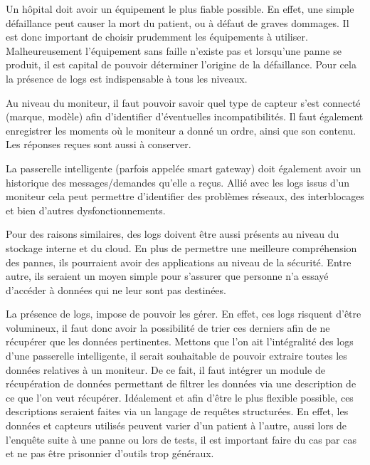 Un hôpital doit avoir un équipement le plus fiable possible. En effet, une simple défaillance peut causer la mort du patient, ou
à défaut de graves dommages. Il est donc important de choisir prudemment les équipements à utiliser. Malheureusement l'équipement
sans faille n'existe pas et lorsqu'une panne se produit, il est capital de pouvoir déterminer l'origine de la défaillance. Pour
cela la présence de logs est indispensable à tous les niveaux. 
\newline

Au niveau du moniteur, il faut pouvoir savoir quel type de capteur s'est connecté (marque, modèle) afin d'identifier d'éventuelles
incompatibilités. Il faut également enregistrer les moments où le moniteur a donné un ordre, ainsi que son contenu.
Les réponses reçues sont aussi à conserver.
\newline

La passerelle intelligente (parfois appelée smart gateway) doit également avoir un historique des messages/demandes qu'elle a
reçus. Allié avec les logs issus d'un moniteur cela peut permettre d'identifier des problèmes réseaux, des interblocages et bien
d'autres dysfonctionnements.
\newline 

Pour des raisons similaires, des logs doivent être aussi présents au niveau du stockage interne et du cloud. En plus de permettre
une meilleure compréhension des pannes, ils pourraient avoir des applications au niveau de la sécurité. Entre autre, ils seraient
un moyen simple pour s'assurer que personne n'a essayé d'accéder à données qui ne leur sont pas destinées.
\newline

La présence de logs, impose de pouvoir les gérer. En effet, ces logs risquent d'être volumineux, il faut donc avoir la
possibilité de trier ces derniers afin de ne récupérer que les données pertinentes. Mettons que l'on ait l'intégralité des logs
d'une passerelle intelligente, il serait souhaitable de pouvoir extraire toutes les données relatives à un moniteur. De ce fait,
il faut intégrer un module de récupération de données permettant de filtrer les données via une description de ce que l'on veut
récupérer. Idéalement et afin d'être le plus flexible possible, ces descriptions seraient faites via un langage de requêtes
structurées. En effet, les données et capteurs utilisés peuvent varier d'un patient à l'autre, aussi lors de l'enquête suite à une
panne ou lors de tests, il est important faire du cas par cas et ne pas être prisonnier d'outils trop généraux.
\newline

